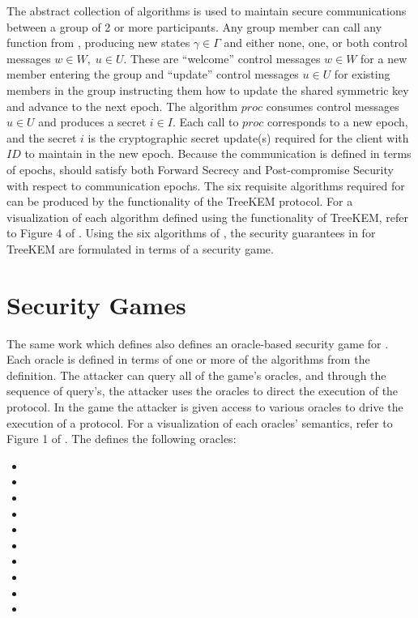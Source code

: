 The abstract collection of algorithms \CGKAdef is used to maintain secure communications between a group of 2 or more participants.
Any group member can call any function from \CGKAdef, producing new states \(\gamma \in \Gamma\) and either none, one, or both control messages \(w \in W,\; u \in U\).
These are ``welcome'' control messages \(w \in W\) for a new member entering the group and ``update'' control messages \(u \in U\) for existing members in the group instructing them how to update the shared symmetric key and advance to the next epoch.
The algorithm \(proc\) consumes control messages \(u \in U\) and produces a secret \(i \in I\).
Each call to \(proc\) corresponds to a new epoch, and the secret \(i\) is the cryptographic secret update(s) required for the client with \(ID\) to maintain  in the new epoch.
Because the communication is defined in terms of epochs,  should satisfy both Forward Secrecy and Post-compromise Security with respect to communication epochs.
The six requisite algorithms required for \CGKAdef can be produced by the functionality of the TreeKEM protocol.
For a visualization of each \CGKAdef algorithm defined using the functionality of TreeKEM, refer to Figure 4 of \autocite{alwen2020security}.
Using the six algorithms of \CGKAdef, the security guarantees in for TreeKEM are formulated in terms of a security game.


\hypertarget{sec:security-games}{%
\section{Security Games}\label{sec:security-games}}

The same work which defines  also defines an oracle-based security game for .
Each oracle is defined in terms of one or more of the algorithms from the \CGKAdef definition.
The attacker can query all of the game's oracles, and through the sequence of query's, the attacker uses the oracles to direct the execution of the  protocol.
In the game the attacker is given access to various oracles to drive the execution of a  protocol.
For a visualization of each oracles' semantics, refer to Figure 1 of \autocite{alwen2020security}.
The \CGKAsec defines the following oracles:

\begin{itemize}
\item {}
\item {}
\item {}
\item {}
\item {}
\item {}
\item {}
\item {}
\item {}
\item {}
\end{itemize}

